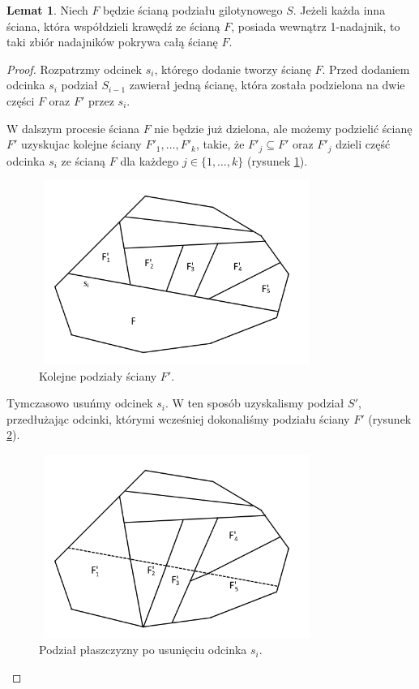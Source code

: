 \documentclass[brudnopis]{xmgr}
\theoremstyle{definition}
\newtheorem{Lemat}{Lemat}
\begin{document}
\begin{Lemat}\label{sasiednie sciany strzega F} \cite{knadajniki}
  Niech $F$ będzie ścianą podziału gilotynowego $S$. Jeżeli każda inna ściana, która współdzieli krawędź ze ścianą $F$, posiada wewnątrz 1-nadajnik, to taki zbiór nadajników pokrywa całą ścianę $F$.
\end{Lemat}
\begin{proof}
\indent Rozpatrzmy odcinek $s_i$, którego dodanie tworzy ścianę $F$. Przed dodaniem odcinka $s_i$ podział $S_{i-1}$ zawierał jedną ścianę, która została podzielona na dwie części $F$ oraz $F'$ przez $s_i$. 

W dalszym procesie ściana $F$ nie będzie już dzielona, ale możemy podzielić ścianę $F'$ uzyskujac kolejne ściany $F'_1, \ldots, F'_k$, takie, że $F'_j \subseteq F'$ oraz $F'_j$ dzieli część odcinka $s_i$ ze ścianą $F$ dla każdego $j \in \{1,\ldots,k\}$ (rysunek \ref{fig:podzial F' na kolejne ściany}).

\begin{figure}[ht!]
  \centering
  \includegraphics[width=9cm,height=6cm]{rysunki/podzial_F'.png}
  \caption{Kolejne podziały ściany $F'$.}
  \label{fig:podzial F' na kolejne ściany}
\end{figure} 
Tymczasowo usuńmy odcinek $s_i$. W ten sposób uzyskalismy podział $S'$, przedłużając odcinki, którymi wcześniej dokonaliśmy podziału ściany $F'$ (rysunek \ref{fig:podzial po usunieciu si}).

\begin{figure}[ht!]
  \centering
  \includegraphics[width=9cm,height=6cm]{rysunki/usuniete_si.png}
  \caption{Podział płaszczyzny po usunięciu odcinka $s_i$.}
  \label{fig:podzial po usunieciu si}
\end{figure} 


\end{proof}
\end{document}
